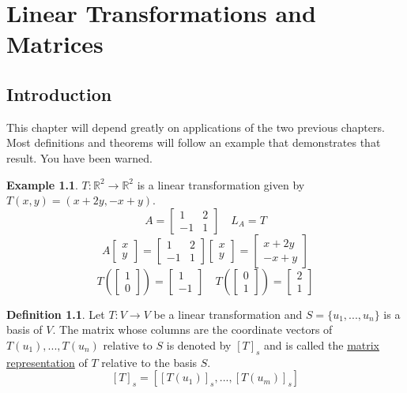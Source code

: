 \documentclass{report}
\theoremstyle{definition}
\newtheorem*{_def}{Definition}
\newtheorem{ex}{Example}[section]
\theoremstyle{remark}
\begin{document}
\chapter{Linear Transformations and Matrices}

\section{Introduction}

This chapter will depend greatly on applications of the two previous chapters.
Most definitions and theorems will follow an example that demonstrates that result.
You have been warned.

\begin{ex}
$T:\mathbb{R}^2\rightarrow\mathbb{R}^2$ is a linear transformation given by $T(x,y)=(x+2y,-x+y)$.
\[A=
\begin{bmatrix}
1 & 2 \\ -1 & 1
\end{bmatrix}
\quad
L_A=T
\]
\[
A\begin{bmatrix}
x \\ y
\end{bmatrix}=
\begin{bmatrix}
1 & 2 \\ -1 & 1
\end{bmatrix}
\begin{bmatrix}
x \\ y
\end{bmatrix}=
\begin{bmatrix}
x+2y \\ -x+y
\end{bmatrix}
\]
\[
T\left(\begin{bmatrix}
1 \\ 0
\end{bmatrix}\right)=
\begin{bmatrix}
1 \\ -1
\end{bmatrix}\quad
T\left(\begin{bmatrix}
0 \\ 1
\end{bmatrix}\right)=
\begin{bmatrix}
2 \\ 1
\end{bmatrix}
\]
\end{ex}

\begin{_def}
Let $T:V\rightarrow V$ be a linear transformation and $S=\{u_1,...,u_n\}$ is a basis of $V$.
The matrix whose columns are the coordinate vectors of $T(u_1),...,T(u_n)$ relative to $S$ is denoted by $[T]_s$ and is called the \underline{matrix representation} of $T$ relative to the basis $S$.
\[
[T]_s=\left[[T(u_1)]_s,...,[T(u_m)]_s\right]
\]
\end{_def}
\end{document}

